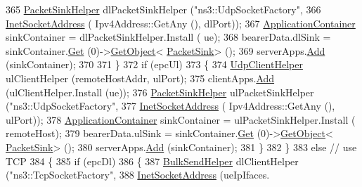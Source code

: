 \begin{DoxyCode}
365                       \hyperlink{classns3_1_1PacketSinkHelper}{PacketSinkHelper} dlPacketSinkHelper (\textcolor{stringliteral}{"ns3::UdpSocketFactory"},
366                                                            \hyperlink{classns3_1_1InetSocketAddress}{InetSocketAddress} (
      Ipv4Address::GetAny (), dlPort));
367                       \hyperlink{classns3_1_1ApplicationContainer}{ApplicationContainer} sinkContainer = dlPacketSinkHelper.Install (
      ue);
368                       bearerData.dlSink = sinkContainer.\hyperlink{classns3_1_1ApplicationContainer_a9e565807abd4213a56566a7ccd8d7509}{Get} (0)->\hyperlink{classns3_1_1Object_a13e18c00017096c8381eb651d5bd0783}{GetObject}<
      \hyperlink{classns3_1_1PacketSink}{PacketSink}> ();
369                       serverApps.\hyperlink{classns3_1_1ApplicationContainer_ad09ab1a1ad5849d518d5f4c262e38152}{Add} (sinkContainer);
370 
371                     \}
372                   \textcolor{keywordflow}{if} (epcUl)
373                     \{
374                       \hyperlink{classns3_1_1UdpClientHelper}{UdpClientHelper} ulClientHelper (remoteHostAddr, ulPort);
375                       clientApps.\hyperlink{classns3_1_1ApplicationContainer_ad09ab1a1ad5849d518d5f4c262e38152}{Add} (ulClientHelper.Install (ue));
376                       \hyperlink{classns3_1_1PacketSinkHelper}{PacketSinkHelper} ulPacketSinkHelper (\textcolor{stringliteral}{"ns3::UdpSocketFactory"},
377                                                            \hyperlink{classns3_1_1InetSocketAddress}{InetSocketAddress} (
      Ipv4Address::GetAny (), ulPort));
378                       \hyperlink{classns3_1_1ApplicationContainer}{ApplicationContainer} sinkContainer = ulPacketSinkHelper.Install (
      remoteHost);
379                       bearerData.ulSink = sinkContainer.\hyperlink{classns3_1_1ApplicationContainer_a9e565807abd4213a56566a7ccd8d7509}{Get} (0)->\hyperlink{classns3_1_1Object_a13e18c00017096c8381eb651d5bd0783}{GetObject}<
      \hyperlink{classns3_1_1PacketSink}{PacketSink}> ();
380                       serverApps.\hyperlink{classns3_1_1ApplicationContainer_ad09ab1a1ad5849d518d5f4c262e38152}{Add} (sinkContainer);
381                     \}
382                 \}
383               \textcolor{keywordflow}{else} \textcolor{comment}{// use TCP}
384                 \{
385                   \textcolor{keywordflow}{if} (epcDl)
386                     \{
387                       \hyperlink{classns3_1_1BulkSendHelper}{BulkSendHelper} dlClientHelper (\textcolor{stringliteral}{"ns3::TcpSocketFactory"},
388                                                      \hyperlink{classns3_1_1InetSocketAddress}{InetSocketAddress} (ueIpIfaces.

\end{DoxyCode}
